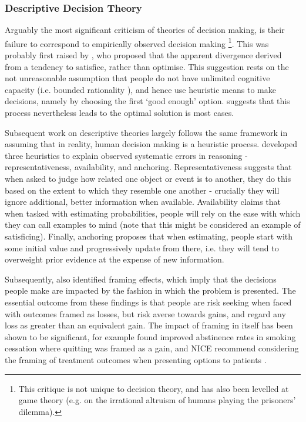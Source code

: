 \subsubsection{Descriptive Decision Theory}

Arguably the most significant criticism of theories of decision making,
is their failure to correspond to empirically observed decision making
\footnote{This critique is not unique to decision theory, and has also been
levelled at game theory (e.g. \citet{Fehr2003} on the irrational
altruism of humans playing the prisoners' dilemma).%
}. This was probably first raised by \citet{Simon1956}, who proposed that the
apparent divergence derived from a tendency to satisfice, rather than
optimise. This suggestion rests on the not unreasonable assumption
that people do not have unlimited cognitive capacity (i.e. bounded
rationality \citep{Simon2000}), and hence use heuristic means to
make decisions, namely by choosing the first `good enough' option.
\citeauthor{Simon1956} suggests that this process nevertheless leads
to the optimal solution is most cases.

Subsequent work on descriptive theories largely follows the same framework
in assuming that in reality, human decision making is a heuristic
process. \citet{Tversky1974} developed three heuristics to explain
observed systematic errors in reasoning - representativeness, availability,
and anchoring. Representativeness suggests that when asked to judge
how related one object or event is to another, they do this based
on the extent to which they resemble one another - crucially they
will ignore additional, better information when available. Availability
claims that when tasked with estimating probabilities, people will
rely on the ease with which they can call examples to mind (note that
this might be considered an example of satisficing). Finally, anchoring
proposes that when estimating, people start with some initial value
and progressively update from there, i.e. they will tend to overweight
prior evidence at the expense of new information. 

Subsequently, \citet{Kahneman1984,Tversky1986} also identified framing
effects, which imply that the decisions people make are impacted by
the fashion in which the problem is presented. The essential outcome
from these findings is that people are risk seeking when faced with
outcomes framed as losses, but risk averse towards gains, and regard
any loss as greater than an equivalent gain. The impact of framing
in itself has been shown to be significant, for example \citet{Toll2007}
found improved abstinence rates in smoking cessation where quitting
was framed as a gain, and \ac{NICE} recommend considering the framing
of treatment outcomes when presenting options to patients \citep{NICE2007}.

